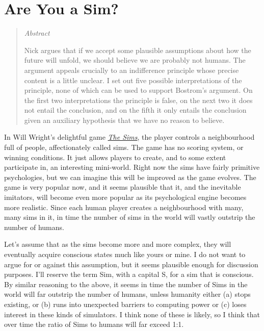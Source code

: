 
%
%
%
%
%
%
%
%
%
%
\chapter{Are You a Sim?}


\begin{quote}
{\itshape
Abstract}

Nick \citet{Bostrom2003} argues that if we accept some plausible assumptions about how the future will unfold, we should believe we are probably not humans. The argument appeals crucially to an indifference principle whose precise content is a little unclear. I set out five possible interpretations of the principle, none of which can be used to support Bostrom's argument. On the first two interpretations the principle is false, on the next two it does not entail the conclusion, and on the fifth it only entails the conclusion given an auxiliary hypothesis that we have no reason to believe.
\end{quote}

\noindent In Will Wright's delightful game \href{http://thesims.ea.com/}{{\textit{The Sims}}}, the player controls a neighbourhood full of people, affectionately called sims. The game has no scoring system, or winning conditions. It just allows players to create, and to some extent participate in, an interesting mini-world. Right now the sims have fairly primitive psychologies, but we can imagine this will be improved as the game evolves. The game is very popular now, and it seems plausible that it, and the inevitable imitators, will become even more popular as its psychological engine becomes more realistic. Since each human player creates a neighbourhood with many, many sims in it, in time the number of sims in the world will vastly outstrip the number of humans.

Let's assume that as the sims become more and more complex, they will eventually acquire conscious states much like yours or mine. I do not want to argue for or against this assumption, but it seems plausible enough for discussion purposes. I'll reserve the term Sim, with a capital S, for a sim that is conscious. By similar reasoning to the above, it seems in time the number of Sims in the world will far outstrip the number of humans, unless humanity either (a) stops existing, or (b) runs into unexpected barriers to computing power or (c) loses interest in these kinds of simulators. I think none of these is likely, so I think that over time the ratio of Sims to humans will far exceed 1:1.

